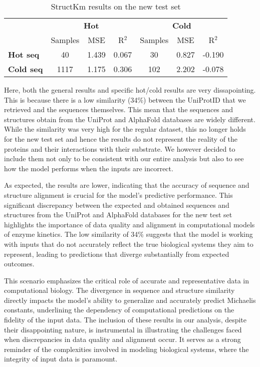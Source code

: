 \begin{table}[ht]
  \centering
  \begin{tabular}{lcccccc}
  \hline
   & \multicolumn{3}{c}{\textbf{Hot}} & \multicolumn{3}{c}{\textbf{Cold}} \\
   & Samples & MSE & R\(^2\) & Samples & MSE & R\(^2\) \\ \hline
  \textbf{Hot seq}  & 40 & 1.439 & 0.067 & 30 & 0.827 & -0.190 \\
  \textbf{Cold seq} & 1117 & 1.175 & 0.306 & 102 & 2.202 & -0.078 \\ \hline
  \end{tabular}
  \caption{StructKm results on the new test set}
  \label{tab:summary_performance}
\end{table}

Here, both the general results and specific hot/cold results are very dissapointing. This is because there is a low similarity (34\%) between the UniProtID that we retrieved and the sequences themselves. This mean that the sequences and structures obtain from the UniProt and AlphaFold databases are widely different. While the similarity was very high for the regular dataset, this no longer holds for the new test set and hence the results do not represent the reality of the proteins and their interactions with their substrate. We however decided to include them not only to be consistent with our entire analysis but also to see how the model performs when the inputs are incorrect.

As expected, the results are lower, indicating that the accuracy of sequence and structure alignment is crucial for the model's predictive performance. This significant discrepancy between the expected and obtained sequences and structures from the UniProt and AlphaFold databases for the new test set highlights the importance of data quality and alignment in computational models of enzyme kinetics. The low similarity of 34\% suggests that the model is working with inputs that do not accurately reflect the true biological systems they aim to represent, leading to predictions that diverge substantially from expected outcomes.

This scenario emphasizes the critical role of accurate and representative data in computational biology. The divergence in sequence and structure similarity directly impacts the model's ability to generalize and accurately predict Michaelis constants, underlining the dependency of computational predictions on the fidelity of the input data. The inclusion of these results in our analysis, despite their disappointing nature, is instrumental in illustrating the challenges faced when discrepancies in data quality and alignment occur. It serves as a strong reminder of the complexities involved in modeling biological systems, where the integrity of input data is paramount.

